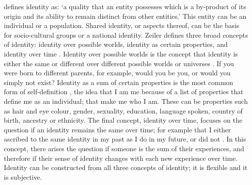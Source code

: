 \textcite{Wiley_1981} defines identity as: ‘a quality that an entity possesses which is a by-product of its origin and its ability to remain distinct from other entities.’ This entity can be an individual or a population. Shared identity, or aspects thereof, can be the basis for socio-cultural groups or a national identity. Zeiler defines three broad concepts of identity: identity over possible worlds, identity as certain properties, and identity over time \parencite{Zeiler_2007}. Identity over possible worlds is the concept that identity is either the same or different over different possible worlds or universes \parencite{Zeiler_2007}.  
If you were born to different parents, for example, would you be you, or would you simply not exist? Identity as a sum of certain properties is the most common form of self-definition \parencite{Zeiler_2007}, 
the idea that I am me because of a list of properties that define me as an individual; that make me who I am. These can be properties such as hair and eye colour, gender, sexuality, education, language spoken, country of birth, ancestry or ethnicity. The final concept, identity over time, focuses on the question if an identity remains the same over time; for example that I either ascribed to the same identity in my past as I do in my future, or did not \parencite{Zeiler_2007}. In this concept, there arises the question if someone is the sum of their experiences, and therefore if their sense of identity changes with each new experience over time. Identity can be constructed from all three concepts of identity; it is flexible and it is subjective.


